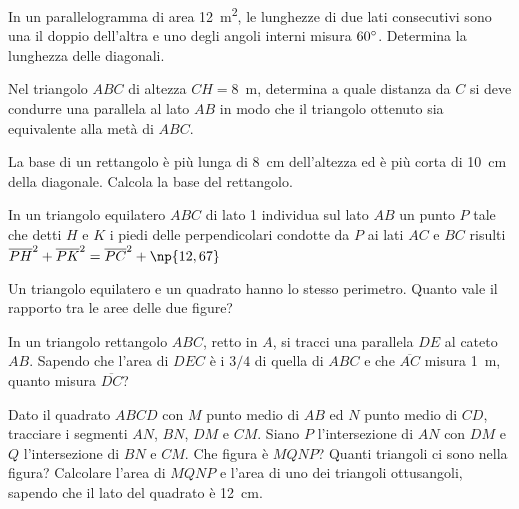 \begin{multicols}{2}
\begin{esercizio}
\label{ese:7.36}
In un parallelogramma di area 12~m\textsuperscript{2}, le lunghezze di due lati consecutivi sono una il doppio dell'altra e uno degli angoli interni misura $60{}^{\circ}$. Determina la lunghezza delle diagonali.
\end{esercizio}

\begin{esercizio}
\label{ese:7.37}
Nel triangolo $ABC$ di altezza $CH=8$~m, determina a quale distanza da $C$ si deve condurre una parallela al lato $AB$ in modo che il triangolo ottenuto sia equivalente alla metà di $ABC$.
\end{esercizio}

\begin{esercizio}
\label{ese:7.38}
La base di un rettangolo è più lunga di 8~cm dell'altezza ed è più corta di 10~cm della diagonale. Calcola la base del rettangolo. 			
\end{esercizio}

\begin{esercizio}
\label{ese:7.39}
In un triangolo equilatero $ABC$ di lato 1 individua sul lato $AB$ un punto $P$ tale che detti $H$ e $K$ i piedi delle perpendicolari condotte da $P$ ai lati $AC$ e $BC$ risulti $\overline{PH}^2+\overline{PK}^2=\overline{PC}^2+\np{12,67}$
\end{esercizio}

\begin{esercizio}
\label{ese:7.40}
Un triangolo equilatero e un quadrato hanno lo stesso perimetro. Quanto vale il rapporto tra le aree delle due figure?
\end{esercizio}

\begin{esercizio}
\label{ese:7.41}
In un triangolo rettangolo $ABC$, retto in $A$, si tracci una parallela $DE$ al cateto $AB$. Sapendo che l'area di $DEC$ è i $3/4$ di quella di $ABC$ e che $\overline{AC}$ misura 1~m, quanto misura $\overline{DC}$?
\end{esercizio}

\begin{esercizio}
\label{ese:7.42}
Dato il quadrato $ABCD$ con $M$ punto medio di $AB$ ed $N$ punto medio di $CD$, tracciare i segmenti $AN$, $BN$, $DM$ e $CM$. Siano $P$ l'intersezione di $AN$ con $DM$ e $Q$ l'intersezione di $BN$ e $CM$. Che figura è $MQNP$? Quanti triangoli ci sono nella figura? Calcolare l'area di $MQNP$ e l'area di uno dei triangoli ottusangoli, sapendo che il lato del quadrato è 12~cm.
\end{esercizio}


\end{multicols}
